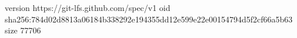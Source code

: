 version https://git-lfs.github.com/spec/v1
oid sha256:784d02d8813a06184b338292e194355dd12e599e22e00154794d5f2cf66a5b63
size 77706
